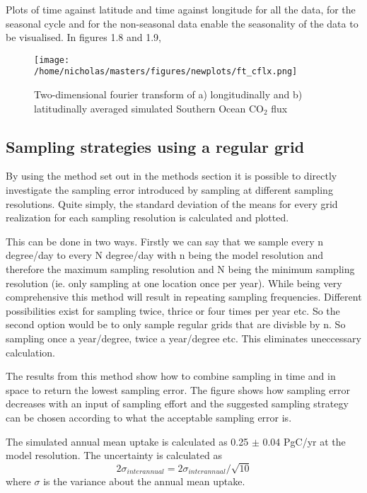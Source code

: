 \documentclass[11pt, a4paper]{article}
\numberwithin{figure}{section}
\numberwithin{table}{section}
\begin{document}
Plots of time against latitude and time against longitude for all the data, for 
the seasonal cycle and for the non-seasonal data enable the seasonality of the 
data to be visualised. In figures 1.8 and 1.9, 

  \begin{figure}[H]
    \caption{Two-dimensional fourier transform of a) longitudinally and b) latitudinally averaged
	simulated Southern Ocean CO$_2$ flux}
  \centering
    \texttt{[image: /home/nicholas/masters/figures/newplots/ft\_cflx.png]}
  \end{figure}

\clearpage 

\subsection{Sampling strategies using a regular grid}
By using the method set out in the methods section it is possible to 
directly investigate the sampling error introduced by sampling at 
different sampling resolutions. 
Quite simply, the standard deviation of the means for every grid 
realization for each sampling resolution is calculated and plotted.

This can be done in two ways. 
Firstly we can say that we sample every n 
degree/day to every N degree/day with n being the model resolution and 
therefore the maximum sampling resolution and N being the minimum 
sampling resolution (ie. only sampling at one location once per year). 
While being very comprehensive this method will result in repeating 
sampling frequencies. 
Different possibilities exist for sampling twice, 
thrice or four times per year etc.
So the second option would be to only sample regular grids that are 
divisble by n. 
So sampling once a year/degree, twice a year/degree etc. 
This eliminates uneccessary calculation.

The results from this method show how to combine sampling in time and 
in space to return the lowest sampling error. 
The figure shows how sampling error decreases with an input of sampling
effort and the suggested sampling strategy can be chosen according to 
what the acceptable sampling error is.

%

The simulated annual mean uptake is calculated as 0.25 $\pm$ 0.04 PgC/yr
at the model resolution. 
The uncertainty is calculated as 
\begin{equation}
2\sigma_{interannual} = 2\sigma_{interannual}/\sqrt{10}
\end{equation}
where $\sigma$ is the variance about the annual mean uptake.
\end{document}

